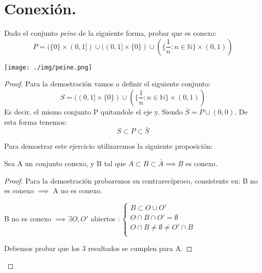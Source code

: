 \section{Conexión.}
\begin{ejer} Dado el conjunto \emph{peine} de la siguiente forma, probar que es conexo:
\[
	P = (\{ 0\} \times (0,1]) \cup ((0,1] \times \{0\}) \cup (\{\frac{1}{n} : n \in \mathbb{N}\} \times (0,1))
\]

\begin{center}
\texttt{[image: ./img/peine.png]}
\end{center}

\begin{proof}
Para la demostración vamos a definir el siguiente conjunto:
\[
	S = ((0,1] \times \{0\}) \cup (\{\frac{1}{n} : n \in \mathbb{N}\} \times (0,1))
\]
Es decir, el mismo conjunto P quitandole el eje y. Siendo $\bar{S} = P \cup (0,0)$.
De esta forma tenemos:
\[
S \subset P \subset \bar{S}
\]

Para demostrar este ejercicio utilizaremos la siguiente proposición:\\

\begin{nprop}
Sea A un conjunto conexo, y B tal que $A \subset B \subset \bar{A} \implies B$ es conexo.
\end{nprop}

\begin{proof}
 Para la demostración probaremos su contrarecíproco, consistente en: B no es conexo $\implies$ A no es conexo.

B no es conexo $\implies \exists O,O'$ abiertos $: \begin{cases}
B \subset O\cup O'\\
O \cap B \cap O' = \emptyset\\
O \cap B \neq \emptyset \neq O' \cap B\\
\end{cases}$

 Debemos probar que los 3 resultados se cumplen para A.


\end{proof}
\end{proof}
\end{ejer}
